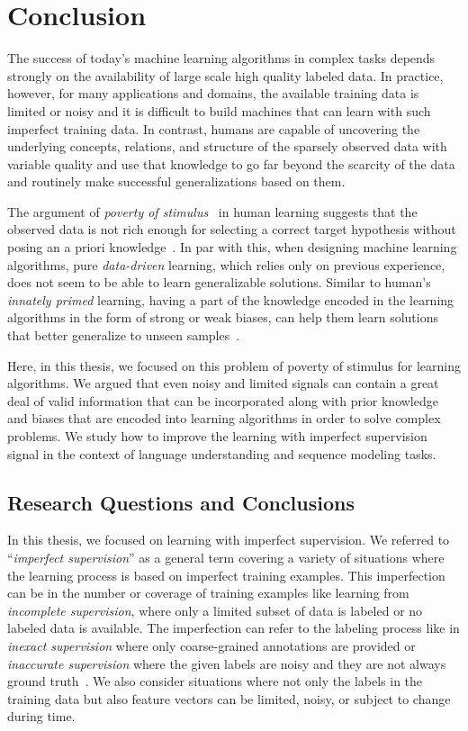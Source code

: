 \chapter{Conclusion}
The success of today's machine learning algorithms in complex tasks depends strongly on the availability of large scale high quality labeled data. In practice, however, for many applications and domains, the available training data is limited or noisy and it is difficult to build machines that can learn with such imperfect training data.
%
In contrast, humans are capable of uncovering the underlying concepts, relations, and structure of the sparsely observed data with variable quality and use that knowledge to go far beyond the scarcity of the data and routinely make successful generalizations based on them.

The argument of \emph{poverty of stimulus}~\citep{chomsky1980rules} in human learning suggests that the observed data is not rich enough for selecting a correct target hypothesis without posing an a priori knowledge~\citep{chomsky1971problems}.
%
In par with this, when designing machine learning algorithms, pure \emph{data-driven} learning, which relies only on previous experience, does not seem to be able to learn generalizable solutions. Similar to human's \emph{innately primed} learning, having a part of the knowledge encoded in the learning algorithms in the form of strong or weak biases, can help them learn solutions that better generalize to unseen samples~\citep{Mitchell80theneed, Mitchell:1997:ML}.

Here, in this thesis, we focused on this problem of poverty of stimulus for learning algorithms. We argued that even noisy and limited signals can contain a great deal of valid information that can be incorporated along with prior knowledge and biases that are encoded into learning algorithms in order to solve complex problems. 
We study how to improve the learning with imperfect supervision signal in the context of language understanding and sequence modeling tasks.


\section{Research Questions and Conclusions}
In this thesis, we focused on learning with imperfect supervision. We referred to ``\emph{imperfect supervision}'' as a general term covering a variety of situations where the learning process is based on imperfect training examples. This imperfection can be in the number or coverage of training examples like learning from \emph{incomplete supervision}, where only a limited subset of data is labeled or no labeled data is available. The imperfection can refer to the labeling process like in \emph{inexact supervision} where only coarse-grained annotations are provided or \emph{inaccurate supervision} where the given labels are noisy and they are not always ground truth~\citep{zhou2018brief}. We also consider situations where not only the labels in the training data but also feature vectors can be limited, noisy, or subject to change during time.

